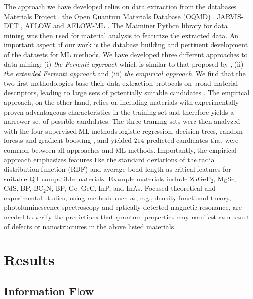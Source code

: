 \documentclass[superscriptaddress,unsortedaddress,
 amsmath,amssymb,
 aps,
]{revtex4-2}
\begin{document}
The approach we have developed relies on data extraction from the databases Materials Project \cite{Jain2013,Jain2018}, the Open Quantum Materials Database (OQMD) \cite{Saal2013, Kirklin2015}, JARVIS-DFT \cite{Choudhary2020}, AFLOW \cite{Curtarolo2012, Curtarolo2012a, Calderon2015} and AFLOW-ML \cite{Isayev2017}. 
The Matminer Python library for data mining \cite{Ward2018} was then used for material analysis to featurize the extracted data. An important aspect of our work is the database building and pertinent development of the datasets for ML methods. We have developed three different approaches to data mining: (i) \emph{the Ferrenti approach} which is similar to that proposed by \citeauthor{Ferrenti2020} \cite{Ferrenti2020}, (ii) 
\emph{the extended Ferrenti approach} and (iii) \emph{the empirical approach}. We find that the %
two first methodologies base their data extraction protocols on broad material descriptors, leading to large sets of potentially suitable candidates \cite{Mehta2019,Hastie2009}. The  
empirical approach, on the other hand, relies on including materials with experimentally proven advantageous characteristics in the training set and therefore yields a narrower set of possible candidates.  The three training sets were then analyzed with the four supervised ML methods logistic regression, decision trees, random forests and gradient boosting \cite{Hastie2009,Murphy2012}, and yielded $214$ predicted candidates that were common between all approaches and ML methods. Importantly, the empirical approach emphasizes features like the standard deviations  of  the  radial  distribution  function  (RDF) and average bond length as critical features for suitable QT compatible materials.
Example materials include ZnGeP$_2$, MgSe, CdS, BP, BC$_2$N, BP, Ge, GeC, InP, and InAs. 
Focused theoretical and experimental studies, using methods such as, e.g., density functional theory, photoluminescence spectroscopy and optically detected magnetic resonance, are needed to verify the predictions that quantum properties may manifest as a result of defects or nanostructures in the above listed materials. 

\section*{Results}

\subsection*{Information Flow} 
\end{document}
